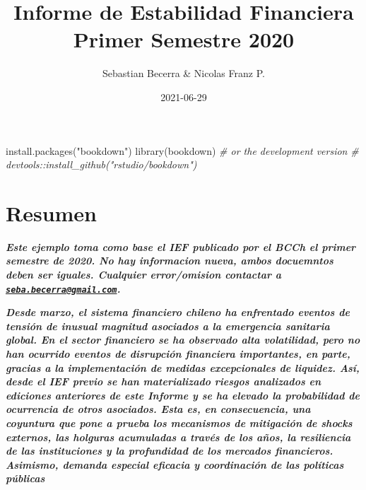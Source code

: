 \documentclass[
]{book}
\title{Informe de Estabilidad Financiera Primer Semestre 2020}
\author{Sebastian Becerra \& Nicolas Franz P.}
\date{2021-06-29}
\newenvironment{Shaded}{\begin{snugshade}}{\end{snugshade}}
\newcommand{\CommentTok}[1]{\textcolor[rgb]{0.56,0.35,0.01}{\textit{#1}}}
\newcommand{\FunctionTok}[1]{\textcolor[rgb]{0.00,0.00,0.00}{#1}}
\newcommand{\NormalTok}[1]{#1}
\newcommand{\StringTok}[1]{\textcolor[rgb]{0.31,0.60,0.02}{#1}}
\begin{document}
\maketitle

{
\setcounter{tocdepth}{1}
\tableofcontents
}
\begin{Shaded}
\begin{Highlighting}[]
\FunctionTok{install.packages}\NormalTok{(}\StringTok{"bookdown"}\NormalTok{)}
\FunctionTok{library}\NormalTok{(}\StringTok{\textquotesingle{}bookdown\textquotesingle{}}\NormalTok{)}
\CommentTok{\# or the development version}
\CommentTok{\# devtools::install\_github("rstudio/bookdown")}
\end{Highlighting}
\end{Shaded}

\hypertarget{Resumen}{%
\chapter*{Resumen}\label{Resumen}}

\textbf{\emph{Este ejemplo toma como base el IEF publicado por el BCCh el primer semestre de 2020. No hay informacion nueva, ambos docuemntos deben ser iguales. Cualquier error/omision contactar a \href{mailto:seba.becerra@gmail.com}{\nolinkurl{seba.becerra@gmail.com}}.}}

\textbf{\emph{Desde marzo, el sistema financiero chileno ha enfrentado eventos de tensión
de inusual magnitud asociados a la emergencia sanitaria global. En el sector
financiero se ha observado alta volatilidad, pero no han ocurrido eventos de
disrupción financiera importantes, en parte, gracias a la implementación de
medidas excepcionales de liquidez. Así, desde el IEF previo se han materializado
riesgos analizados en ediciones anteriores de este Informe y se ha elevado
la probabilidad de ocurrencia de otros asociados. Esta es, en consecuencia,
una coyuntura que pone a prueba los mecanismos de mitigación de shocks
externos, las holguras acumuladas a través de los años, la resiliencia de las
instituciones y la profundidad de los mercados financieros. Asimismo, demanda
especial eficacia y coordinación de las políticas públicas}}
\end{document}
